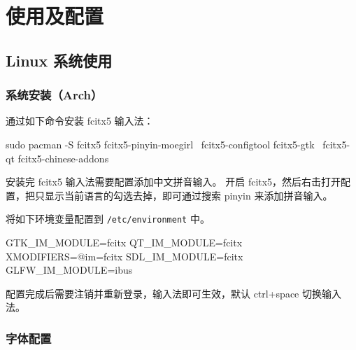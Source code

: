 \chapter{使用及配置}

\section{Linux 系统使用}

\subsection{系统安装（Arch）}


通过如下命令安装 fcitx5 输入法：

\begin{lstcode}
  sudo pacman -S fcitx5 fcitx5-pinyin-moegirl \
        fcitx5-configtool fcitx5-gtk \
        fcitx5-qt fcitx5-chinese-addons
\end{lstcode}

安装完 fcitx5 输入法需要配置添加中文拼音输入。
开启 fcitx5，然后右击打开配置，把只显示当前语言的勾选去掉，即可通过搜索 pinyin 来添加拼音输入。


将如下环境变量配置到 \lstinline{/etc/environment} 中。

\begin{lstcode}
  GTK_IM_MODULE=fcitx
  QT_IM_MODULE=fcitx
  XMODIFIERS=@im=fcitx
  SDL_IM_MODULE=fcitx
  GLFW_IM_MODULE=ibus
\end{lstcode}

配置完成后需要注销并重新登录，输入法即可生效，默认 ctrl+space 切换输入法。

\subsection{字体配置}

